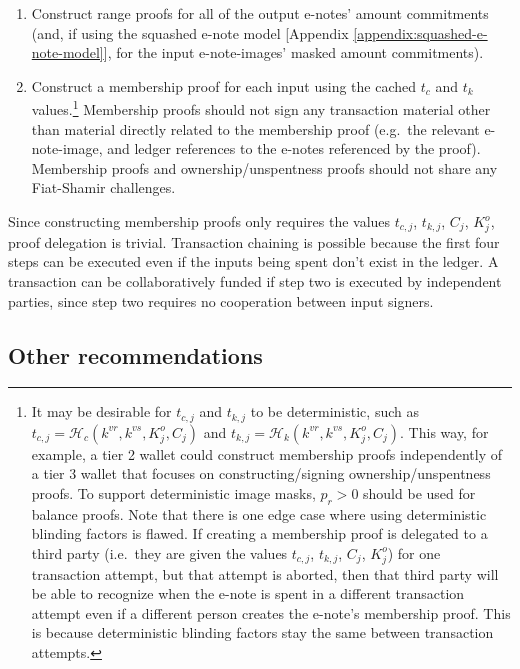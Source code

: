 \begin{enumerate}
    \item Construct range proofs for all of the output e-notes' amount commitments (and, if using the squashed e-note model [Appendix \ref{appendix:squashed-e-note-model}], for the input e-note-images' masked amount commitments).

    \item Construct a membership proof for each input using the cached $t_c$ and $t_k$ values.\footnote{It may be desirable for $t_{c,j}$ and $t_{k,j}$ to be deterministic, such as $t_{c,j} = \mathcal{H}_c(k^{vr}, k^{vs}, K^o_j, C_j)$ and $t_{k,j} = \mathcal{H}_k(k^{vr}, k^{vs}, K^o_j, C_j)$. This way, for example, a tier 2 wallet could construct membership proofs independently of a tier 3 wallet that focuses on constructing/signing ownership/unspentness proofs. To support deterministic image masks, $p_r > 0$ should be used for balance proofs. Note that there is one edge case where using deterministic blinding factors is flawed. If creating a membership proof is delegated to a third party (i.e.\ they are given the values $t_{c,j}$, $t_{k,j}$, $C_j$, $K^o_j$) for one transaction attempt, but that attempt is aborted, then that third party will be able to recognize when the e-note is spent in a different transaction attempt even if a different person creates the e-note's membership proof. This is because deterministic blinding factors stay the same between transaction attempts.} Membership proofs should not sign any transaction material other than material directly related to the membership proof (e.g.\ the relevant e-note-image, and ledger references to the e-notes referenced by the proof). Membership proofs and ownership/unspentness proofs should not share any Fiat-Shamir challenges.
\end{enumerate}

Since constructing membership proofs only requires the values $t_{c,j}$, $t_{k,j}$, $C_j$, $K^o_j$, proof delegation is trivial. Transaction chaining is possible because the first four steps can be executed even if the inputs being spent don't exist in the ledger. A transaction can be collaboratively funded if step two is executed by independent parties, since step two requires no cooperation between input signers.


\subsection{Other recommendations}
\label{subsec:implementers-other-recommendations}

